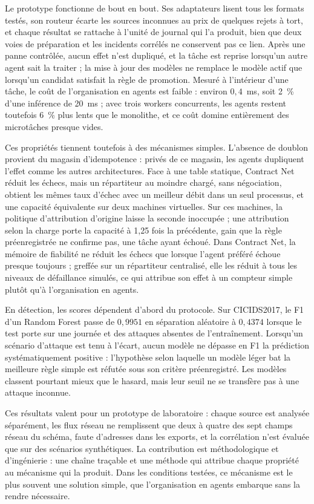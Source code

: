 \documentclass[12pt,a4paper,oneside]{report}
\begin{document}
Le prototype fonctionne de bout en bout. Ses adaptateurs lisent tous les formats testés, son routeur écarte les sources inconnues au prix de quelques rejets à tort, et chaque résultat se rattache à l'unité de journal qui l'a produit, bien que deux voies de préparation et les incidents corrélés ne conservent pas ce lien. Après une panne contrôlée, aucun effet n'est dupliqué, et la tâche est reprise lorsqu'un autre agent sait la traiter ; la mise à jour des modèles ne remplace le modèle actif que lorsqu'un candidat satisfait la règle de promotion. Mesuré à l'intérieur d'une tâche, le coût de l'organisation en agents est faible : environ $0{,}4$~ms, soit 2~\% d'une inférence de 20~ms ; avec trois workers concurrents, les agents restent toutefois 6~\% plus lents que le monolithe, et ce coût domine entièrement des microtâches presque vides.

Ces propriétés tiennent toutefois à des mécanismes simples. L'absence de doublon provient du magasin d'idempotence : privés de ce magasin, les agents dupliquent l'effet comme les autres architectures. Face à une table statique, Contract Net réduit les échecs, mais un répartiteur au moindre chargé, sans négociation, obtient les mêmes taux d'échec avec un meilleur débit dans un seul processus, et une capacité équivalente sur deux machines virtuelles. Sur ces machines, la politique d'attribution d'origine laisse la seconde inoccupée ; une attribution selon la charge porte la capacité à 1,25 fois la précédente, gain que la règle préenregistrée ne confirme pas, une tâche ayant échoué. Dans Contract Net, la mémoire de fiabilité ne réduit les échecs que lorsque l'agent préféré échoue presque toujours ; greffée sur un répartiteur centralisé, elle les réduit à tous les niveaux de défaillance simulés, ce qui attribue son effet à un compteur simple plutôt qu'à l'organisation en agents.

En détection, les scores dépendent d'abord du protocole. Sur CICIDS2017, le F1 d'un Random Forest passe de $0{,}9951$ en séparation aléatoire à $0{,}4374$ lorsque le test porte sur une journée et des attaques absentes de l'entraînement. Lorsqu'un scénario d'attaque est tenu à l'écart, aucun modèle ne dépasse en F1 la prédiction systématiquement positive : l'hypothèse selon laquelle un modèle léger bat la meilleure règle simple est réfutée sous son critère préenregistré. Les modèles classent pourtant mieux que le hasard, mais leur seuil ne se transfère pas à une attaque inconnue.

Ces résultats valent pour un prototype de laboratoire : chaque source est analysée séparément, les flux réseau ne remplissent que deux à quatre des sept champs réseau du schéma, faute d'adresses dans les exports, et la corrélation n'est évaluée que sur des scénarios synthétiques. La contribution est méthodologique et d'ingénierie : une chaîne traçable et une méthode qui attribue chaque propriété au mécanisme qui la produit. Dans les conditions testées, ce mécanisme est le plus souvent une solution simple, que l'organisation en agents embarque sans la rendre nécessaire.
\end{document}
